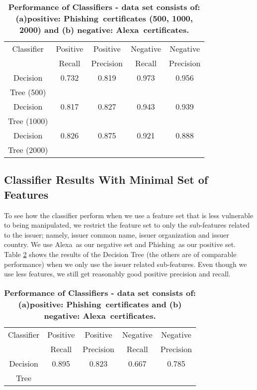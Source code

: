 \documentclass[twocolumn]{article}
\newcommand{\Alexa}{\textsf{Alexa}}
\newcommand{\phishing}{\textsf{Phishing}}
\begin{document}
\begin{table}[t]
\centering
{\footnotesize
\begin{tabular}{|c|c|c|c|c|}
\hline

Classifier & Positive & Positive & Negative & Negative\\
        & Recall & Precision & Recall & Precision\\
\hline
Decision  & 0.732 &  0.819 & 0.973  & 0.956\\
Tree (500) &&&&\\
\hline
Decision  & 0.817  & 0.827  & 0.943  & 0.939 \\
Tree (1000) &&&&\\
\hline
Decision  & 0.826  & 0.875  & 0.921  & 0.888 \\
Tree (2000) &&&&\\
\hline
\end{tabular}
}
\vspace{-0.1cm}
\caption{\bf Performance of Classifiers - data set consists of: (a)positive: \phishing\  certificates (500, 1000, 2000)
 and (b) negative: \Alexa\  certificates.\vspace{0.5cm} }
\label{tab:class-3}
\end{table}

\subsection{Classifier Results With Minimal Set of Features}\label{minsetfeatures}
To see how the classifier perform when we use a feature set that is less vulnerable to being manipulated, we restrict the feature set to only the sub-features related to the issuer; namely, issuer common name, issuer organization and issuer country. We use \Alexa\ as our negative set and \phishing\ as our positive set. Table \ref{tab:class-4} shows the results of the  Decision Tree (the others are of comparable performance) when we only use the issuer related sub-features. Even though we use less features, we still get reasonably good positive precision and recall. 

\begin{table}[t]
\centering
{\footnotesize
\begin{tabular}{|c|c|c|c|c|}
\hline

Classifier & Positive & Positive & Negative & Negative\\
        & Recall & Precision & Recall & Precision\\
\hline
Decision  & 0.895 &  0.823 & 0.667  & 0.785\\
Tree&&&&\\
\hline
\end{tabular}
}
\caption{\bf Performance of Classifiers - data set consists of: (a)positive: \phishing\  certificates
 and (b) negative: \Alexa\  certificates. }
\label{tab:class-4}
\end{table}
\end{document}
